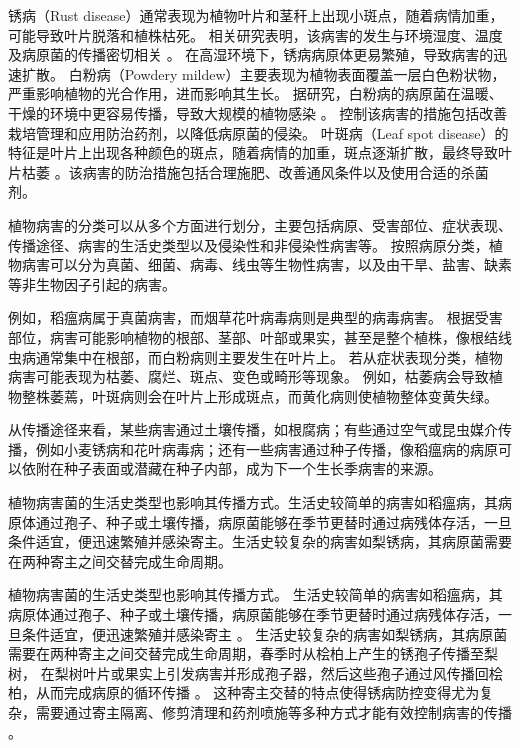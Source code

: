 \documentclass[AutoFakeBold]{LZUThesis-PgD&PhD}
\begin{document}
	锈病（Rust disease）通常表现为植物叶片和茎秆上出现小斑点，随着病情加重，可能导致叶片脱落和植株枯死。
	相关研究表明，该病害的发生与环境湿度、温度及病原菌的传播密切相关 \citep{mendgen2002plant, huber1992modeling}。
	在高湿环境下，锈病病原体更易繁殖，导致病害的迅速扩散。
	白粉病（Powdery mildew）主要表现为植物表面覆盖一层白色粉状物，严重影响植物的光合作用，进而影响其生长。
	据研究，白粉病的病原菌在温暖、干燥的环境中更容易传播，导致大规模的植物感染 \citep{glawe2008powdery, yarwood1957powdery}。
	控制该病害的措施包括改善栽培管理和应用防治药剂，以降低病原菌的侵染。
	叶斑病（Leaf spot disease）的特征是叶片上出现各种颜色的斑点，随着病情的加重，斑点逐渐扩散，最终导致叶片枯萎 \citep{agrios2005plant, thomma2003alternaria}。该病害的防治措施包括合理施肥、改善通风条件以及使用合适的杀菌剂。	
	
	植物病害的分类可以从多个方面进行划分，主要包括病原、受害部位、症状表现、传播途径、病害的生活史类型以及侵染性和非侵染性病害等。
	按照病原分类，植物病害可以分为真菌、细菌、病毒、线虫等生物性病害，以及由干旱、盐害、缺素等非生物因子引起的病害。
	
	例如，稻瘟病属于真菌病害，而烟草花叶病毒病则是典型的病毒病害\citep{goldbach2001tobacco, desselberger2015viruses}。
	根据受害部位，病害可能影响植物的根部、茎部、叶部或果实，甚至是整个植株，像根结线虫病通常集中在根部，而白粉病则主要发生在叶片上\citep{glawe2008powdery}。
	若从症状表现分类，植物病害可能表现为枯萎、腐烂、斑点、变色或畸形等现象。
	例如，枯萎病会导致植物整株萎蔫，叶斑病则会在叶片上形成斑点，而黄化病则使植物整体变黄失绿\citep{watson2009comparing}。

	从传播途径来看，某些病害通过土壤传播，如根腐病；有些通过空气或昆虫媒介传播，例如小麦锈病和花叶病毒病；还有一些病害通过种子传播，像稻瘟病的病原可以依附在种子表面或潜藏在种子内部，成为下一个生长季病害的来源\citep{zeigler1996rice, kamoun2005late}。
	
	植物病害菌的生活史类型也影响其传播方式。生活史较简单的病害如稻瘟病，其病原体通过孢子、种子或土壤传播，病原菌能够在季节更替时通过病残体存活，一旦条件适宜，便迅速繁殖并感染寄主\citep{zeigler1996rice}。生活史较复杂的病害如梨锈病，其病原菌需要在两种寄主之间交替完成生命周期\citep{jacquemart2015life}。
	
	植物病害菌的生活史类型也影响其传播方式。
	生活史较简单的病害如稻瘟病，其病原体通过孢子、种子或土壤传播，病原菌能够在季节更替时通过病残体存活，一旦条件适宜，便迅速繁殖并感染寄主 \cite{qiu2010}。
	生活史较复杂的病害如梨锈病，其病原菌需要在两种寄主之间交替完成生命周期，春季时从桧柏上产生的锈孢子传播至梨树，
	在梨树叶片或果实上引发病害并形成孢子器，然后这些孢子通过风传播回桧柏，从而完成病原的循环传播 \cite{yu2018}。
	这种寄主交替的特点使得锈病防控变得尤为复杂，需要通过寄主隔离、修剪清理和药剂喷施等多种方式才能有效控制病害的传播 \cite{palmieri2022}。
\end{document}
